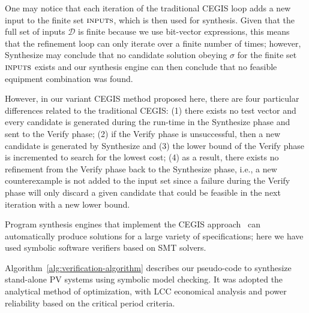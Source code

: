\documentclass[journal]{IEEEtran}
\begin{document}
One may notice that each iteration of the traditional CEGIS loop adds a new input to the finite set $\text{\sc inputs}$, which is then used for synthesis.  Given that the full set of inputs $\mathcal{D}$ is finite because we use bit-vector expressions, this means that the refinement loop can only iterate over a finite number of times; however, {\sc Synthesize} may conclude that no candidate solution obeying $\sigma$ for the finite set $\text{\sc inputs}$ exists and our synthesis engine can then conclude that no feasible equipment combination was found.

However, in our variant CEGIS method proposed here, there are four particular differences related to the traditional CEGIS: 
(1) there exists no test vector and every candidate is generated during the run-time in the {\sc Synthesize} phase and sent to the {\sc Verify} phase; 
(2) if the {\sc Verify} phase is unsuccessful, then a new candidate is generated by {\sc Synthesize} and 
(3) the lower bound of the {\sc Verify} phase is incremented to search for the lowest cost; 
(4) as a result, there exists no refinement from the {\sc Verify} phase back to the {\sc Synthesize} phase, i.e., 
a new counterexample is not added to the {\sc input} set since a failure during the {\sc Verify} phase will only discard 
a given candidate that could be feasible in the next iteration with a new lower bound.

Program synthesis engines that implement the CEGIS approach~\cite{sketch} can automatically produce solutions for a large variety of specifications; here we have used symbolic software verifiers based on SMT solvers.

Algorithm~\ref{alg:verification-algorithm} describes our pseudo-code to synthesize stand-alone PV systems using symbolic model checking. It was adopted the analytical method of optimization, with LCC economical analysis and power reliability based on the critical period criteria.
\end{document}
